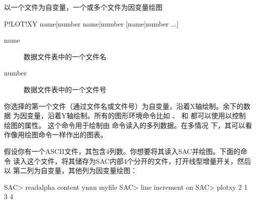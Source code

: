 \label{cmd:plotxy}

以一个文件为自变量，一个或多个文件为因变量绘图

\begin{SACSTX}
P!LOT!XY name|number name|number [name|number ...]
\end{SACSTX}

\begin{description}
\item [name] 数据文件表中的一个文件名
\item [number] 数据文件表中的一个文件号
\end{description}

你选择的第一个文件（通过文件名或文件号）为自变量，沿着X轴绘制。余下的数据
为因变量，沿着Y轴绘制。所有的图形环境命令比如 、
 和  都可以使用以控制绘图的属性。
这个命令用于绘制由  命令读入的多列数据。在多情况
下，其可以看作像用绘图命令一样作出的图表。

假设你有一个ASCII文件，其包含4列数。你想要将其读入SAC并绘图。下面的命令
读入这个文件，将其储存为SAC内部4个分开的文件，打开线型增量开关，然后以
第二列为自变量，其他列为因变量绘图：
\begin{SACCode}
SAC> readalpha content ynnn myfile
SAC> line increment on
SAC> plotxy 2 1 3 4
\end{SACCode}
